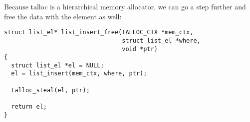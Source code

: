 \noindent
Because talloc is a hierarchical memory allocator, we can go a step further and
free the data with the element as well:

\begin{lstlisting}[caption={Free the data with the list element},
morekeywords={talloc_steal}]
struct list_el* list_insert_free(TALLOC_CTX *mem_ctx,
                                 struct list_el *where,
                                 void *ptr)
{
  struct list_el *el = NULL;
  el = list_insert(mem_ctx, where, ptr);

  talloc_steal(el, ptr);

  return el;
}
\end{lstlisting}
